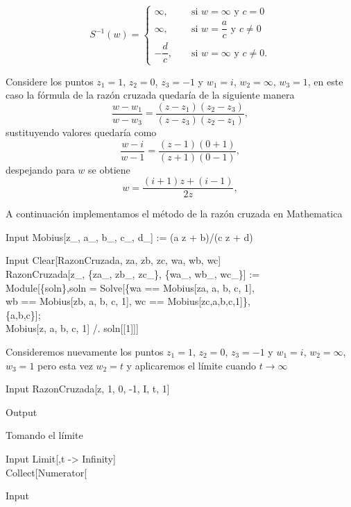 \[
S^{-1}(w)=\left\{ \begin{array}{ccl}
	\infty,& &\mbox{ si } w=\infty \mbox{ y } c=0\\
	\infty,& &\mbox{ si } w=\dfrac{a}{c} \mbox{ y } c\neq0\\
	-\dfrac{d}{c},& &\mbox{ si } w=\infty \mbox{ y } c\neq0.
\end{array} \right.
\]
\begin{Ejem}
	Considere los puntos $z_1=1$, $z_2=0$, $z_3=-1$ y $w_1=i$, $w_2=\infty$, $w_3=1$, en este caso la fórmula de la razón cruzada quedaría de la siguiente manera
	$$\dfrac{w-w_1}{w-w_3}=\dfrac{(z-z_1)(z_2-z_3)}{(z-z_3)(z_2-z_1)},$$
	sustituyendo valores quedaría como
	$$\dfrac{w-i}{w-1}=\dfrac{(z-1)(0+1)}{(z+1)(0-1)},$$
	despejando para $w$ se obtiene 
	$$w=\dfrac{(i+1)z+(i-1)}{2z},$$
\end{Ejem}
A continuación implementamos el método de la razón cruzada en Mathematica
\begin{mmaCell}{Input}
	 Mobius[z_, a_, b_, c_, d_] := (a z + b)/(c z + d)\\
\end{mmaCell}
\begin{mmaCell}{Input}
	 Clear[RazonCruzada, za, zb, zc, wa, wb, wc]\\RazonCruzada[z_, \{za_, zb_, zc_\}, \{wa_, wb_, wc_\}] :=\\Module[\{soln\},soln = Solve[\{wa == Mobius[za, a, b, c, 1],\\wb == Mobius[zb, a, b, c, 1], wc == Mobius[zc,a,b,c,1]\},\\\{a,b,c\}];\\Mobius[z, a, b, c, 1] /. soln[[1]]]
\end{mmaCell}
Consideremos nuevamente los puntos $z_1=1$, $z_2=0$, $z_3=-1$ y $w_1=i$, $w_2=\infty$, $w_3=1$ pero esta vez $w_2= t$ y aplicaremos el límite cuando $t\rightarrow\infty$
\begin{mmaCell}{Input}
	   RazonCruzada[z, {1, 0, -1}, {I, t, 1}]
\end{mmaCell}
\begin{mmaCell}[moredefined={t}]{Output}
\end{mmaCell}
Tomando el límite 
\begin{mmaCell}[moredefined={t}]{Input}
	 Limit[,t -> Infinity]\\Collect[Numerator[%
\end{mmaCell}
\begin{mmaCell}{Input}
\end{mmaCell}

